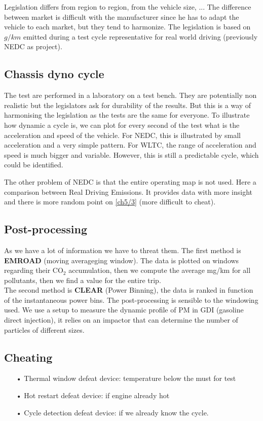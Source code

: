 	Legislation differs from region to region, from the vehicle size, ... The difference between market is difficult with the manufacturer since he has to adapt the vehicle to each market, but they tend to harmonize. The legislation is based on $g/km$ emitted during a test cycle representative for real world driving (previously NEDC as project). 
	
\subsection{Chassis dyno cycle}
		The test are performed in a laboratory on a test bench. They are potentially non realistic but the legislators ask for durability of the results. But this is a way of harmonising the legislation as the tests are the same for everyone. To illustrate how dynamic a cycle is, we can plot for every second of the test what is the acceleration and speed of the vehicle. For NEDC, this is illustrated by small acceleration and a very simple pattern. For WLTC, the range of acceleration and speed is much bigger and variable. However, this is still a predictable cycle, which could be identified.
		
		The other problem of NEDC is that the entire operating map is not used. Here a comparison between Real Driving Emissions. It provides data with more insight and there is more random point on \autoref{ch5/3} (more difficult to cheat).
		
\subsection{Post-processing}
	As we have a lot of information we have to threat them. The first method is \textbf{EMROAD} (moving averageging window). The data is plotted on windows regarding their CO$_2$ accumulation, then we compute the average mg/km for all pollutants, then we find a value for the entire trip. \\
	
	The second method is \textbf{CLEAR} (Power Binning), the data is ranked in function of the instantaneous power bins. The post-processing is sensible to the windowing used. We use a setup to measure the dynamic profile of PM in GDI (gasoline direct injection), it relies on an impactor that can determine the number of particles of different sizes. 
	
\subsection{Cheating}
	\begin{itemize}
	\item[•] Thermal window defeat device: temperature below the must for test
	\item[•] Hot restart defeat device: if engine already hot
	\item[•] Cycle detection defeat device: if we already know the cycle. \\
	\end{itemize}
	
